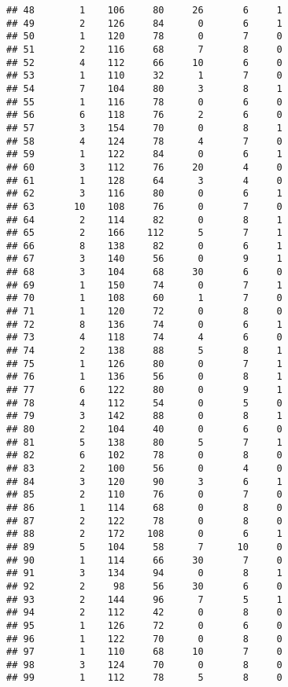 \documentclass[
]{article}
\begin{document}
\begin{verbatim}
## 48        1    106     80     26       6     1
## 49        2    126     84      0       6     1
## 50        1    120     78      0       7     0
## 51        2    116     68      7       8     0
## 52        4    112     66     10       6     0
## 53        1    110     32      1       7     0
## 54        7    104     80      3       8     1
## 55        1    116     78      0       6     0
## 56        6    118     76      2       6     0
## 57        3    154     70      0       8     1
## 58        4    124     78      4       7     0
## 59        1    122     84      0       6     1
## 60        3    112     76     20       4     0
## 61        1    128     64      3       4     0
## 62        3    116     80      0       6     1
## 63       10    108     76      0       7     0
## 64        2    114     82      0       8     1
## 65        2    166    112      5       7     1
## 66        8    138     82      0       6     1
## 67        3    140     56      0       9     1
## 68        3    104     68     30       6     0
## 69        1    150     74      0       7     1
## 70        1    108     60      1       7     0
## 71        1    120     72      0       8     0
## 72        8    136     74      0       6     1
## 73        4    118     74      4       6     0
## 74        2    138     88      5       8     1
## 75        1    126     80      0       7     1
## 76        1    136     56      0       8     1
## 77        6    122     80      0       9     1
## 78        4    112     54      0       5     0
## 79        3    142     88      0       8     1
## 80        2    104     40      0       6     0
## 81        5    138     80      5       7     1
## 82        6    102     78      0       8     0
## 83        2    100     56      0       4     0
## 84        3    120     90      3       6     1
## 85        2    110     76      0       7     0
## 86        1    114     68      0       8     0
## 87        2    122     78      0       8     0
## 88        2    172    108      0       6     1
## 89        5    104     58      7      10     0
## 90        1    114     66     30       7     0
## 91        3    134     94      0       8     1
## 92        2     98     56     30       6     0
## 93        2    144     96      7       5     1
## 94        2    112     42      0       8     0
## 95        1    126     72      0       6     0
## 96        1    122     70      0       8     0
## 97        1    110     68     10       7     0
## 98        3    124     70      0       8     0
## 99        1    112     78      5       8     0

\end{verbatim}
\end{document}
